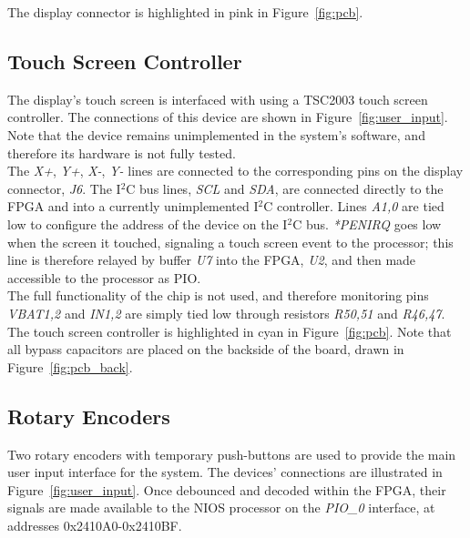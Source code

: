 \documentclass[titlepage]{scrartcl}
\begin{document}
	The display connector is highlighted in pink in Figure~\ref{fig:pcb}.\\

	\subsection{Touch Screen Controller \label{sec:touch_ctrl}}
	The display's touch screen is interfaced with using a TSC2003 touch screen controller. The connections of this device are shown in Figure~\ref{fig:user_input}. Note that the device remains unimplemented in the system's software, and therefore its hardware is not fully tested.\\

	The \textit{X+}, \textit{Y+}, \textit{X-}, \textit{Y-} lines are connected to the corresponding pins on the display connector, \textit{J6}. The I$^2$C bus lines, \textit{SCL} and \textit{SDA}, are connected directly to the FPGA and into a currently unimplemented I$^2$C controller. Lines \textit{A1,0} are tied low to configure the address of the device on the I$^2$C bus. \textit{*PENIRQ} goes low when the screen it touched, signaling a touch screen event to the processor; this line is therefore relayed by buffer \textit{U7} into the FPGA, \textit{U2}, and then made accessible to the processor as PIO.\\

	The full functionality of the chip is not used, and therefore monitoring pins \textit{VBAT1,2} and \textit{IN1,2} are simply tied low through resistors \textit{R50,51} and \textit{R46,47}.\\

	The touch screen controller is highlighted in cyan in Figure~\ref{fig:pcb}. Note that all bypass capacitors are placed on the backside of the board, drawn in Figure~\ref{fig:pcb_back}.\\

	\clearpage
	
	\subsection{Rotary Encoders \label{sec:rotary_encoders}}
	Two rotary encoders with temporary push-buttons are used to provide the main user input interface for the system. The devices' connections are illustrated in Figure~\ref{fig:user_input}. Once debounced and decoded within the FPGA, their signals are made available to the NIOS processor on the \textit{PIO\_0} interface, at addresses 0x2410A0-0x2410BF.\\
\end{document}
